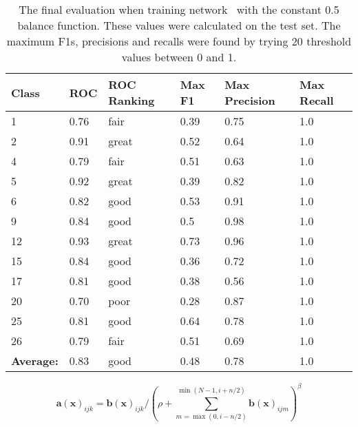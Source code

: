 

\begin{table}[!h]
	\centering
	{\footnotesize
		\begin{tabular}{llllll}
			\hline
      \textbf{Class}    & \textbf{ROC} & \textbf{ROC Ranking} & \textbf{Max F1} & \textbf{Max Precision} & \textbf{Max Recall} \\ \hline
      1  & 0.76 & fair 	& 0.39 	& 0.75 & 1.0 \\
      2  & 0.91 & great  &	0.52 	& 0.64 & 1.0 \\
      4  & 0.79 & fair 	& 0.51 	& 0.63 & 1.0 \\
      5  & 0.92 & great  &	0.39 	& 0.82 & 1.0 \\
      6  & 0.82 & good 	& 0.53 	& 0.91 & 1.0 \\
      9  & 0.84 & good 	& 0.5 	& 0.98 & 1.0 \\
      12 & 0.93 & great  &	0.73 	& 0.96 & 1.0 \\
      15 & 0.84 & good 	& 0.36 	& 0.72 & 1.0 \\
      17 & 0.81 & good 	& 0.38 	& 0.56 & 1.0 \\
      20 & 0.70 & poor 	& 0.28 	& 0.87 & 1.0 \\
      25 & 0.81 & good 	& 0.64 	& 0.78 & 1.0 \\
      26 & 0.79 & fair 	& 0.51 	& 0.69 & 1.0 \\ \hline
     \textbf{Average:} & 0.83          & good                 & 0.48            & 0.78                   & 1.0                 \\ \hline
		\end{tabular} }
	\caption{The final evaluation when training network \networkII\ with the constant 0.5 balance function.
		These values were
		calculated on the test set. The maximum F1s, precisions and recalls
	were found by trying 20 threshold values between 0 and 1.}
	\label{tab:biglisiiit}
\end{table}

\begin{equation} \label{eq:lrn}
  \mathbf{a}(\mathbf{x})_{ijk}
  = \mathbf{b}(\mathbf{x})_{ijk}/\left (\rho + \sum^{\min(N-1,i+n/2)}_{m=\max(0,i-n/2)}\mathbf{b}(\mathbf{x})_{ijm} \right )^\beta
\end{equation}

